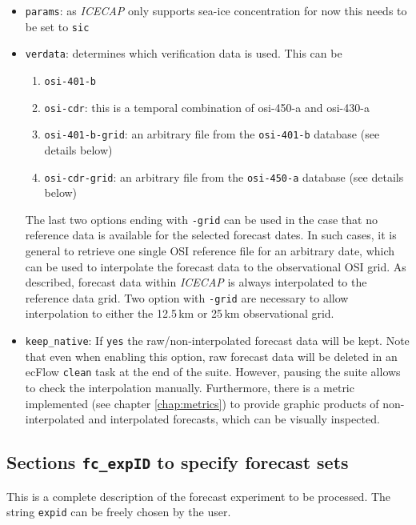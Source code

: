\documentclass[DIV=10, parskip=full]{scrreprt}
\newcommand{\ice}{\textit{ICECAP}\xspace}
\begin{document}
\begin{itemize}
 \item \texttt{params}: as \ice only supports sea-ice concentration for now this needs to be set to \texttt{sic}
 \item \texttt{verdata}: determines which verification data is used. This can be 
 \begin{enumerate}
 	\item \texttt{osi-401-b}
 	\item \texttt{osi-cdr}: this is a temporal combination of osi-450-a and osi-430-a
 	\item \texttt{osi-401-b-grid}: an arbitrary file from the \texttt{osi-401-b} database (see details below)
 	\item \texttt{osi-cdr-grid}: an arbitrary file from the \texttt{osi-450-a} database (see details below)
 \end{enumerate}
 The last two options ending with \texttt{-grid} can be used in the case that no reference data is available for the selected forecast dates. In such cases, it is general to retrieve one single OSI reference file for an arbitrary date, which can be used to interpolate the forecast data to the observational OSI grid. As described, forecast data within \ice is always interpolated to the reference data grid. Two option with \texttt{-grid} are necessary to allow interpolation to either the 12.5\,km or 25\,km observational grid. 
 

  \item \texttt{keep\_native}: If \texttt{yes} the raw/non-interpolated forecast data will be kept. Note that even when enabling this option, raw forecast data will be deleted in an ecFlow \texttt{clean} task at the end of the suite. However, pausing the suite allows to check the interpolation manually. Furthermore, there is a metric implemented (see chapter \ref{chap:metrics}) to provide graphic products of non-interpolated and interpolated forecasts, which can be visually inspected. 
\end{itemize}

\subsection{Sections \texttt{fc\_expID} to specify forecast sets} \label{sec:config_fcsets}
This is a complete description of the forecast experiment to be processed. The string \texttt{expid} can be freely chosen by the user.
\end{document}
